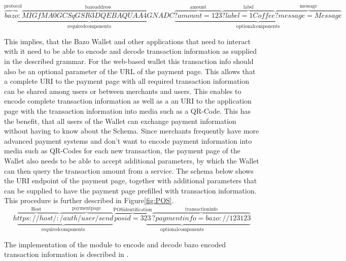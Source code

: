 \[
\underbrace{\overbrace{bazo:}^{\mathrm{protocol}}\overbrace{MIGfMA0GCSqGSIb3DQEBAQUAA4GNADC}^{\mathrm{bazo address}}}_{\mathrm{required components}}
\underbrace{\overbrace{?amount=123}^{\mathrm{amoun t}}\overbrace{?label=1 Coffee}^{\mathrm{label}}\overbrace{?message=Message}^{\mathrm{message}}}_{\mathrm{optional components}}
\]


This implies, that the Bazo Wallet and other applications that need to interact with it need to be able to encode and decode transaction information as supplied in the described grammar.
For the web-based wallet this transaction info should also be an optional parameter of the URL of the payment page. This allows that a complete URI to the payment page with all required transaction information can be shared among users or between merchants and users.
This enables to encode complete transaction information as well as a an URI to the application page with the transaction information into media such as a QR-Code. This has the benefit, that all users of the Wallet can exchange payment information without having to know about the Schema.
Since merchants frequently have more advanced payment systems and don't want to encode payment information into media such as QR-Codes for each new transaction, the payment page of the Wallet also needs to be able to accept additional parameters, by which the Wallet can then query the transaction amount from a service.
The schema below shows the URI endpoint of the payment page, together with additional parameters that can be supplied to have the payment page prefilled with transaction information. This procedure is further described in Figure\ref{fig:POS}.
\[
\underbrace{\overbrace{https://host/:}^{\mathrm{Host}}\overbrace{/auth/user/send}^{\mathrm{payment page}}}_{\mathrm{required components}}
\underbrace{\overbrace{posid=323}^{\mathrm{POS identification}}\overbrace{?paymentinfo=bazo://123123}^{\mathrm{transaction info}}}_{\mathrm{optional components}}
\]

The implementation of the module to encode and decode bazo encoded transaction information is described in \cite{undefined}.

